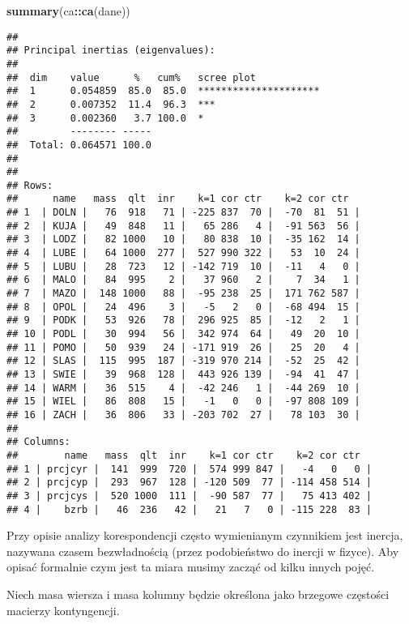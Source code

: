 \documentclass[polish,]{book}
\newenvironment{Shaded}{\begin{snugshade}}{\end{snugshade}}
\newcommand{\KeywordTok}[1]{\textcolor[rgb]{0.13,0.29,0.53}{\textbf{#1}}}
\newcommand{\NormalTok}[1]{#1}
\newcommand{\OperatorTok}[1]{\textcolor[rgb]{0.81,0.36,0.00}{\textbf{#1}}}
\begin{document}
\begin{Shaded}
\begin{Highlighting}[]
\KeywordTok{summary}\NormalTok{(ca}\OperatorTok{::}\KeywordTok{ca}\NormalTok{(dane))}
\end{Highlighting}
\end{Shaded}

\begin{verbatim}
## 
## Principal inertias (eigenvalues):
## 
##  dim    value      %   cum%   scree plot               
##  1      0.054859  85.0  85.0  *********************    
##  2      0.007352  11.4  96.3  ***                      
##  3      0.002360   3.7 100.0  *                        
##         -------- -----                                 
##  Total: 0.064571 100.0                                 
## 
## 
## Rows:
##      name   mass  qlt  inr    k=1 cor ctr    k=2 cor ctr  
## 1  | DOLN |   76  918   71 | -225 837  70 |  -70  81  51 |
## 2  | KUJA |   49  848   11 |   65 286   4 |  -91 563  56 |
## 3  | LODZ |   82 1000   10 |   80 838  10 |  -35 162  14 |
## 4  | LUBE |   64 1000  277 |  527 990 322 |   53  10  24 |
## 5  | LUBU |   28  723   12 | -142 719  10 |  -11   4   0 |
## 6  | MALO |   84  995    2 |   37 960   2 |    7  34   1 |
## 7  | MAZO |  148 1000   88 |  -95 238  25 |  171 762 587 |
## 8  | OPOL |   24  496    3 |   -5   2   0 |  -68 494  15 |
## 9  | PODK |   53  926   78 |  296 925  85 |  -12   2   1 |
## 10 | PODL |   30  994   56 |  342 974  64 |   49  20  10 |
## 11 | POMO |   50  939   24 | -171 919  26 |   25  20   4 |
## 12 | SLAS |  115  995  187 | -319 970 214 |  -52  25  42 |
## 13 | SWIE |   39  968  128 |  443 926 139 |  -94  41  47 |
## 14 | WARM |   36  515    4 |  -42 246   1 |  -44 269  10 |
## 15 | WIEL |   86  808   15 |   -1   0   0 |  -97 808 109 |
## 16 | ZACH |   36  806   33 | -203 702  27 |   78 103  30 |
## 
## Columns:
##        name   mass  qlt  inr    k=1 cor ctr    k=2 cor ctr  
## 1 | prcjcyr |  141  999  720 |  574 999 847 |   -4   0   0 |
## 2 | prcjcyp |  293  967  128 | -120 509  77 | -114 458 514 |
## 3 | prcjcys |  520 1000  111 |  -90 587  77 |   75 413 402 |
## 4 |    bzrb |   46  236   42 |   21   7   0 | -115 228  83 |
\end{verbatim}

Przy opisie analizy korespondencji często wymienianym czynnikiem jest inercja, nazywana czasem bezwładnością (przez podobieństwo do inercji w fizyce). Aby
opisać formalnie czym jest ta miara musimy zacząć od kilku innych pojęć.

Niech masa wiersza i masa kolumny będzie określona jako brzegowe częstości
macierzy kontyngencji.
\end{document}
